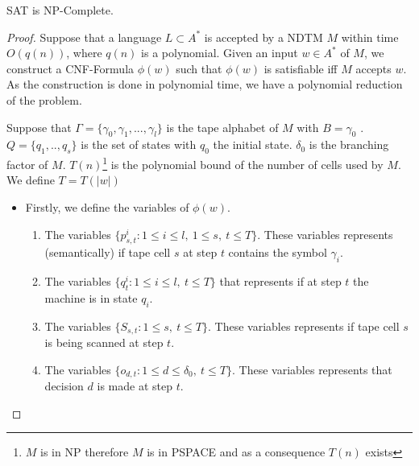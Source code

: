 \begin{theorem}\label{ref:cooklevin}
 SAT is NP-Complete.
\end{theorem}
\begin{proof}
  Suppose that a language $L\subset A^*$ is accepted by a NDTM $M$ within time $O(q(n))$, where $q(n)$ is a polynomial. Given an input  $w\in A^*$ of $M$, we construct a CNF-Formula $\phi(w)$ such that $\phi(w)$ is satisfiable iff $M$ accepts $w$. As the construction is done in polynomial time, we have a polynomial reduction of the problem.
  
  Suppose that $\Gamma = \{\gamma_0,\gamma_1,...,\gamma_l\}$ is the tape alphabet  of $M$ with $B=\gamma_0$ .$Q=\{q_1,..,q_s\}$ is the set of states with $q_0$ the initial state. $\delta_0$ is the branching factor of $M$. $T(n)$\footnote{$M$ is in NP therefore $M$ is in PSPACE and as a consequence $T(n)$ exists } is the polynomial bound of the number of cells used by $M$. We define $T=T(|w|)$

  \begin{itemize}
  \item Firstly, we define the variables of $\phi(w)$.
    \begin{enumerate}
    \item The variables $\{p_{s,t}^i : 1 \le i \le l,\ 1 \le s,\ t \le T \}$. These variables represents (semantically) if tape cell $s$ at step $t$ contains the symbol $\gamma_i$.
    \item The variables $\{q_{t}^i : 1 \le i \le l,\ t \le T \}$ that represents if at step $t$ the machine is in state $q_i$.
    \item The variables $\{S_{s,t} :  1 \le s,\ t \le T \}$. These variables represents if tape cell $s$  is being scanned at step $t$.
    \item The variables $\{o_{d,t} :  1 \le d \le \delta_0,\ t \le T \}$. These variables represents that decision $d$ is made at step $t$.
    \end{enumerate}


\end{itemize}
\end{proof}
